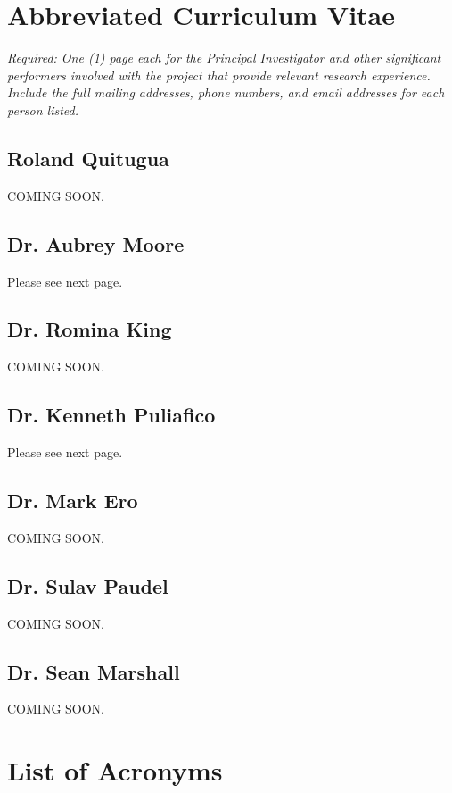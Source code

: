 \documentclass[11pt,english,letterpaper]{scrartcl}
\begin{document}
\appendix

\newpage

\section{Abbreviated Curriculum Vitae}

\textit{Required: One (1) page each for the Principal Investigator and other significant performers involved with the project that provide relevant research experience. Include the full mailing addresses, phone numbers, and email addresses for each person listed.}

\subsection{Roland Quitugua}
COMING SOON.

\subsection{Dr. Aubrey Moore}
Please see next page.


\subsection{Dr. Romina King}
COMING SOON.

\subsection{Dr. Kenneth Puliafico}
Please see next page.


\subsection{Dr. Mark Ero}
COMING SOON.

\subsection{Dr. Sulav Paudel}
COMING SOON.

\subsection{Dr. Sean Marshall}
COMING SOON.

\clearpage
\section{List of Acronyms}
\end{document}
